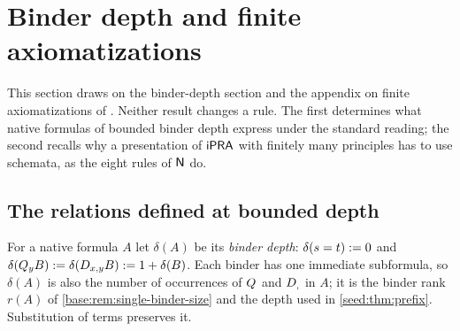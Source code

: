 \section{Binder depth and finite axiomatizations}
\label{kern:sec:depth}

This section draws on the binder-depth section and the appendix on finite
axiomatizations of .  Neither result changes a rule.  The
first determines what native formulas of bounded binder depth express under
the standard reading; the second recalls why a presentation of $\mathsf{iPRA}$ with
finitely many principles has to use schemata, as the eight rules of $\mathsf{N}$
do.

\subsection{The relations defined at bounded depth}
\label{kern:sec:depthclass}

For a native formula $A$ let $\delta(A)$ be its \emph{binder depth}:
$\delta(s=t)\mathrel{:=}0$ and $\delta(Q_{y}B)\mathrel{:=}\delta(D_{x,y}B)\mathrel{:=}
1+\delta(B)$.  Each binder has one immediate subformula, so $\delta(A)$ is
also the number of occurrences of $Q_{}$ and $D_{,}$ in $A$; it is the
binder rank $r(A)$ of \cref{base:rem:single-binder-size} and the depth used
in \cref{seed:thm:prefix}.  Substitution of terms preserves it.

